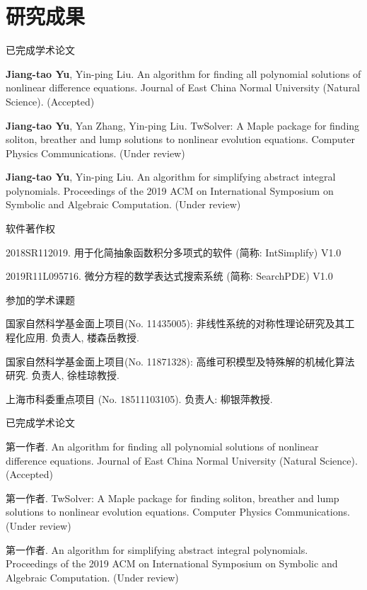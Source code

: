 \chapter*{研究成果}

\ifdefined\RELESE %

\noindent 已完成学术论文
\begin{enumerate}[label={[\arabic*]},leftmargin=*]
\item {\bf Jiang-tao Yu}, Yin-ping Liu. An algorithm for finding all polynomial
solutions of nonlinear difference equations. Journal of East China Normal University (Natural Science). (Accepted)
\item {\bf Jiang-tao Yu}, Yan Zhang, Yin-ping Liu. TwSolver: A Maple package for finding soliton, breather and lump solutions to nonlinear evolution equations. Computer Physics Communications. (Under review)
\item {\bf Jiang-tao Yu}, Yin-ping Liu. An algorithm for simplifying abstract integral polynomials. Proceedings of the 2019 ACM on International Symposium on Symbolic and Algebraic Computation. (Under review)
\end{enumerate}

\noindent 软件著作权
\begin{enumerate}[label={[\arabic*]},leftmargin=*]
\item 2018SR112019. 用于化简抽象函数积分多项式的软件 (简称: IntSimplify) V1.0
\item 2019R11L095716. 微分方程的数学表达式搜索系统 (简称: SearchPDE) V1.0
\end{enumerate}

\noindent 参加的学术课题
\begin{enumerate}[label={[\arabic*]},leftmargin=*]
\item 国家自然科学基金面上项目(No. 11435005): 非线性系统的对称性理论研究及其工程化应用. 负责人, 楼森岳教授.
\item 国家自然科学基金面上项目(No. 11871328): 高维可积模型及特殊解的机械化算法研究. 负责人, 徐桂琼教授.
\item 上海市科委重点项目 (No. 18511103105). 负责人: 柳银萍教授.
\end{enumerate}

\else %

\noindent 已完成学术论文
\begin{enumerate}[label={[\arabic*]},leftmargin=*]
\item 第一作者. An algorithm for finding all polynomial
solutions of nonlinear difference equations. Journal of East China Normal University (Natural Science). (Accepted)
\item 第一作者. TwSolver: A Maple package for finding soliton, breather and lump solutions to nonlinear evolution equations. Computer Physics Communications. (Under review)
\item 第一作者.  An algorithm for simplifying abstract integral polynomials. Proceedings of the 2019 ACM on International Symposium on Symbolic and Algebraic Computation. (Under review)
\end{enumerate}

